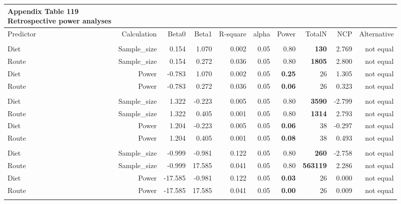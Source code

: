 \documentclass[
  12pt,
  letterpaper,
]{article}
\begin{document}
\begingroup
\fontsize{12.0pt}{14.4pt}\selectfont
\begin{longtable}{l|rrrrrrrrr}
\caption*{
{\large \textbf{Appendix Table 119}} \\ 
{\small \textbf{Retrospective power analyses}}
} \\ 
\toprule
Predictor & {Calculation} & {Beta0} & {Beta1} & {R-square} & {alpha} & {Power} & {TotalN} & {NCP} & {Alternative} \\ 
\midrule\addlinespace[2.5pt]
\multicolumn{10}{l}{Brain} \\[2.5pt] 
\midrule\addlinespace[2.5pt]
Diet & Sample\_size & 0.154 & 1.070 & 0.002 & 0.05 & 0.80 & {\bfseries 130} & 2.769 & not equal \\ 
Route & Sample\_size & 0.154 & 0.272 & 0.036 & 0.05 & 0.80 & {\bfseries 1805} & 2.800 & not equal \\ 
Diet & Power & -0.783 & 1.070 & 0.002 & 0.05 & {\bfseries 0.25} & 26 & 1.305 & not equal \\ 
Route & Power & -0.783 & 0.272 & 0.036 & 0.05 & {\bfseries 0.06} & 26 & 0.323 & not equal \\ 
\midrule\addlinespace[2.5pt]
\multicolumn{10}{l}{Ear} \\[2.5pt] 
\midrule\addlinespace[2.5pt]
Diet & Sample\_size & 1.322 & -0.223 & 0.005 & 0.05 & 0.80 & {\bfseries 3590} & -2.799 & not equal \\ 
Route & Sample\_size & 1.322 & 0.405 & 0.001 & 0.05 & 0.80 & {\bfseries 1314} & 2.793 & not equal \\ 
Diet & Power & 1.204 & -0.223 & 0.005 & 0.05 & {\bfseries 0.06} & 38 & -0.297 & not equal \\ 
Route & Power & 1.204 & 0.405 & 0.001 & 0.05 & {\bfseries 0.08} & 38 & 0.493 & not equal \\ 
\midrule\addlinespace[2.5pt]
\multicolumn{10}{l}{Eye} \\[2.5pt] 
\midrule\addlinespace[2.5pt]
Diet & Sample\_size & -0.999 & -0.981 & 0.122 & 0.05 & 0.80 & {\bfseries 260} & -2.758 & not equal \\ 
Route & Sample\_size & -0.999 & 17.585 & 0.041 & 0.05 & 0.80 & {\bfseries 563119} & 2.286 & not equal \\ 
Diet & Power & -17.585 & -0.981 & 0.122 & 0.05 & {\bfseries 0.03} & 26 & 0.000 & not equal \\ 
Route & Power & -17.585 & 17.585 & 0.041 & 0.05 & {\bfseries 0.00} & 26 & 0.009 & not equal \\ 
\midrule\addlinespace[2.5pt]
\multicolumn{10}{l}{Liver} \\[2.5pt] 

\end{longtable}
\end{document}
